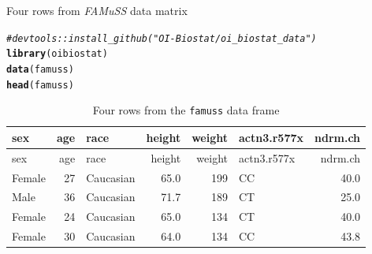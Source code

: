 \documentclass[10pt]{beamer}\usepackage[]{graphicx}\usepackage[]{color}
\makeatletter
\newcommand{\hlcom}[1]{\textcolor[rgb]{0.678,0.584,0.686}{\textit{#1}}}%
\newcommand{\hlstd}[1]{\textcolor[rgb]{0.345,0.345,0.345}{#1}}%
\newcommand{\hlkwd}[1]{\textcolor[rgb]{0.737,0.353,0.396}{\textbf{#1}}}%
\newenvironment{kframe}{%
 \def\at@end@of@kframe{}%
 \ifinner\ifhmode%
  \def\at@end@of@kframe{\end{minipage}}%
  \begin{minipage}{\columnwidth}%
 \fi\fi%
 \def\FrameCommand##1{\hskip\@totalleftmargin \hskip-\fboxsep
 \colorbox{shadecolor}{##1}\hskip-\fboxsep
     \hskip-\linewidth \hskip-\@totalleftmargin \hskip\columnwidth}%
 \MakeFramed {\advance\hsize-\width
   \@totalleftmargin\z@ \linewidth\hsize
   \@setminipage}}%
 {\par\unskip\endMakeFramed%
 \at@end@of@kframe}
\newenvironment{knitrout}{}{} %
\makeatother
\begin{document}
\begin{frame}[fragile]{Four rows from \emph{FAMuSS} data matrix}
	\protect\hypertarget{four-rows-from-famuss-data-matrix}{}
	
	\captionsetup[table]{labelformat=empty}
	
	\scriptsize
	
	\normalsize
	
	\small
	
\begin{knitrout}\scriptsize
{}\color{fgcolor}\begin{kframe}
\begin{alltt}
\hlcom{# devtools::install_github("OI-Biostat/oi_biostat_data")}
\hlkwd{library}\hlstd{(oibiostat)}
\hlkwd{data}\hlstd{(famuss)}
\hlkwd{head}\hlstd{(famuss)}
\end{alltt}
\end{kframe}
\end{knitrout}
	
	
	\begin{longtable}[]{@{}lrlrrlr@{}}
		\caption{Four rows from the \texttt{famuss} data frame}\tabularnewline
		\toprule
		sex & age & race & height & weight & actn3.r577x &
		ndrm.ch\tabularnewline
		\midrule
		\endfirsthead
		\toprule
		sex & age & race & height & weight & actn3.r577x &
		ndrm.ch\tabularnewline
		\midrule
		\endhead
		Female & 27 & Caucasian & 65.0 & 199 & CC & 40.0\tabularnewline
		Male & 36 & Caucasian & 71.7 & 189 & CT & 25.0\tabularnewline
		Female & 24 & Caucasian & 65.0 & 134 & CT & 40.0\tabularnewline
		Female & 30 & Caucasian & 64.0 & 134 & CC & 43.8\tabularnewline
		\bottomrule
	\end{longtable}
	
	\normalsize
	
\end{frame}
\end{document}
